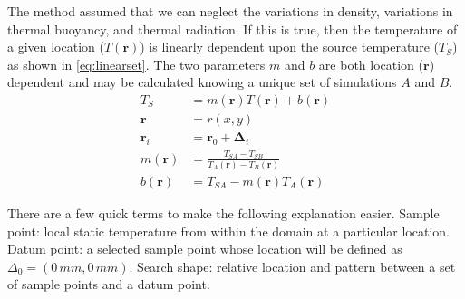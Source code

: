 \documentclass[preprint,12pt]{elsarticle}
\newcommand{\bv}[1]{\boldsymbol #1}  %
\begin{document}
The method assumed that we can neglect the variations in density, variations in thermal buoyancy, and thermal radiation.  If this is true, then the temperature of a given location ($T\left( \bv r \right)$) is linearly dependent upon the source temperature ($T_S$) as shown in \cref{eq:linearset}.  The two parameters $m$ and $b$ are both location ($\bv{r}$) dependent and may be calculated knowing a unique set of simulations $A$ and $B$.
\begin{subequations}
\label{eq:linearset}
\begin{align}
T_S &= m\left(  \bv r  \right) T\left( \bv r \right) + b\left( \bv r \right) \label{eq:linear} \\
\bv r &= r\left( x, y\right) \label{eq:vector}\\
\bv{r_i} & = \bv{r_0} + \bv{\Delta_i} \label{eq:delta}\\
m\left( \bv r \right) &= \frac{T_{SA} - T_{SB}}{T_A\left( \bv r \right) - T_B\left( \bv r \right)} \label{eq:m} \\
b\left( \bv r \right) &= T_{SA} - m\left( \bv r \right) T_A \left( \bv r \right) \label{eq:b}
\end{align}
\end{subequations}

There are a few quick terms to make the following explanation easier.  Sample point: local static temperature from within the domain at a particular location.  Datum point: a selected sample point whose location will be defined as $\Delta_{0} = (0\,mm,0\,mm)$.  Search shape: relative location and pattern between a set of sample points and a datum point.
\end{document}
